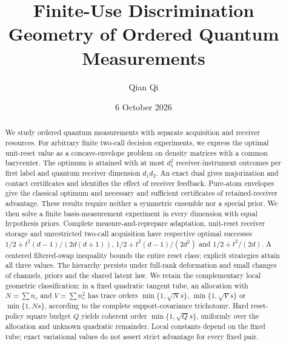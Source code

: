 \documentclass[11pt]{amsart}
\title[Finite-use discrimination geometry]{Finite-Use Discrimination Geometry of Ordered Quantum Measurements}
\author{Qian Qi}
\date{6 October 2026}
\numberwithin{equation}{section}
\theoremstyle{definition}\newtheorem{definition}[theorem]{Definition}
\theoremstyle{remark}\newtheorem{remark}[theorem]{Remark}
\begin{document}
\raggedbottom
\begin{abstract}
We study ordered quantum measurements with separate acquisition and
receiver resources.  For arbitrary finite two-call decision experiments,
we express the optimal unit-reset value as a concave-envelope problem
on density matrices with a common barycenter.  The optimum is attained
with at most $d_1^2$ receiver-instrument outcomes per first label and
quantum receiver dimension $d_1d_2$.  An exact dual gives majorization
and contact certificates and identifies the effect of receiver feedback.
Pure-atom envelopes give the classical optimum and necessary and
sufficient certificates of retained-receiver advantage.
These results require neither a symmetric ensemble nor a special prior.
We then solve a finite basis-measurement experiment in every dimension
with equal hypothesis priors.  Complete measure-and-reprepare adaptation,
unit-reset receiver storage and unrestricted two-call acquisition have
respective optimal successes $1/2+t^2(d-1)/(2d(d+1))$,
$1/2+t^2(d-1)/(2d^2)$ and $1/2+t^2/(2d)$.
A centered filtered-swap inequality bounds the entire reset class;
explicit strategies attain all three values.  The hierarchy persists
under full-rank deformation and small changes of channels, priors and
the shared latent law.  We retain the complementary local geometric
classification: in a fixed quadratic tangent tube, an allocation with
$N=\sum n_r$ and $V=\sum n_r^2$ has trace orders
$\min\{1,\sqrt Ns\}$, $\min\{1,\sqrt Vs\}$ or $\min\{1,Ns\}$,
according to the complete support-covariance trichotomy.
Hard reset-policy square budget $Q$ yields coherent order
$\min\{1,\sqrt Qs\}$, uniformly over the allocation and unknown quadratic
remainder.  Local constants depend on the fixed tube; exact variational
values do not assert strict advantage for every fixed pair.
\end{abstract}
\maketitle



















\end{document}
